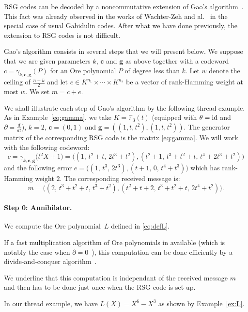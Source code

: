 \documentclass[a4paper]{llncs}
\newcommand{\FF}{\mathbb F}
\newcommand{\id}{\textrm{\rm id}}
\newcommand{\bc}{\textbf{c}}
\newcommand{\bg}{\textbf{g}}
\begin{document}
RSG codes can be decoded by a noncommutative extension of Gao's 
algorithm~\cite{gao}. This fact was already observed in the works of 
Wachter-Zeh and al.~\cite{wachter} in the special case of usual Gabidulin
codes. After what we have done previously, the extension to RSG codes 
is not difficult.

Gao's algorithm consists in several steps that we will 
present below. We suppose that we are given parameters $k$, $\bc$ and
$\bg$ as above together with a codeword $c = \gamma_{k,\bc,\bg}(P)$
for an Ore polynomial $P$ of degree less than $k$. 
Let $w$ denote the ceiling of $\frac{n-k}2$ and 
let $e \in K^{n_1} \times \cdots \times K^{n_s}$ be 
a vector of rank-Hamming weight at most $w$. We set $m = c + e$.

{\small
\begin{example}
We shall illustrate each step of Gao's algorithm by the following 
thread example. As
in Example~\ref{eq:gamma}, we take $K = \FF_3(t)$ (equipped with 
$\theta = \id$ and $\partial = \frac d{dt}$), $k = 2$, $\bc = (0,1)$
and $\bg = ((1,t,t^2),(1,t,t^2))$. The generator matrix of
the corresponding RSG code is the matrix \eqref{eq:gamma}.
We will work with the following codeword:
$$c = \gamma_{k,\bc,\bg}\big(t^2 X + 1\big)
    = \big((1,\,t^2{+}t,\,2t^3{+}t^2), (t^2{+}1,\,t^3{+}t^2{+}t,\,t^4{+}2t^3{+}t^2)\big)$$
and the following error $e = \big((1,\,t^3,\,2t^3), (t{+}1,\,0,\,t^4{+}t^3)\big)$
which has rank-Hamming weight $2$. The corresponding received message is:
$$m = \big(
(2,\,t^3{+}t^2{+}t,\,t^3{+}t^2), (t^2{+}t{+}2,\,t^3{+}t^2{+}t,\,2t^4{+}t^2)\big).$$
\end{example}}

\paragraph{Step 0: Annihilator.}

We compute the Ore polynomial~$L$ defined in \eqref{eq:defL}.

\noindent
If a fast multiplication algorithm of Ore polynomials in available
(which is notably the case when $\partial = 0$~\cite{pushwach,carleb}), 
this computation can be done efficiently by a divide-and-conquer
algorithm~\cite{carleb}.

We underline that this computation is independant of the received
message $m$ and then has to be done just once when the RSG code is 
set up.

{\small
\begin{example}
In our thread example, we have $L(X) = X^6 - X^3$ as shown by
Example~\ref{ex:L}.
\end{example}}
\end{document}
